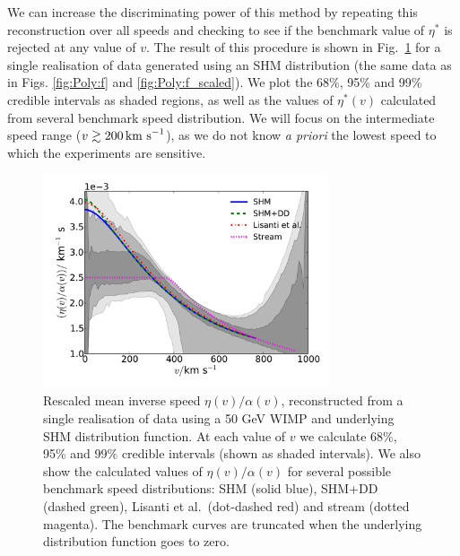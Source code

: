 
We can increase the discriminating power of this method by repeating this reconstruction over all speeds and checking to see if the benchmark value of $\eta^*$ is rejected at any value of $v$. The result of this procedure is shown in Fig.~\ref{fig:Poly:eta} for a single realisation of data generated using an SHM distribution (the same data as in Figs. \ref{fig:Poly:f} and \ref{fig:Poly:f_scaled}). We plot the 68\%, 95\% and 99\% credible intervals as shaded regions, as well as the values of $\eta^*(v)$ calculated from several benchmark speed distribution. We will focus on the intermediate speed range ($v \gtrsim 200 \,\textrm{km s}^{-1}$), as we do not know \textit{a priori} the lowest speed to which the experiments are sensitive.


\begin{figure}[t]
\centering
  \includegraphics[width=0.75\textwidth]{Poly/SHM_lores.pdf}
  \caption[Rescaled mean inverse speed for a single realisation of data for a 50 GeV WIMP with SHM distribution function, showing several benchmark speed distributions for comparison]{Rescaled mean inverse speed $\eta(v)/\alpha(v)$, reconstructed from a single realisation of data using a 50 GeV WIMP and underlying SHM distribution function. At each value of $v$ we calculate 68\%, 95\% and 99\% credible intervals (shown as shaded intervals). We also show the calculated values of $\eta(v)/\alpha(v)$ for several possible benchmark speed distributions: SHM (solid blue), SHM+DD (dashed green), Lisanti et al.\ (dot-dashed red) and stream (dotted magenta). The benchmark curves are truncated when the underlying distribution function goes to zero.}
  \label{fig:Poly:eta}
\end{figure}

